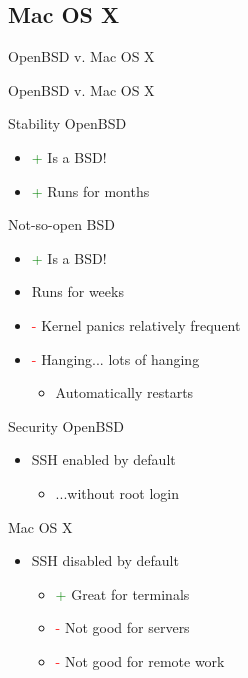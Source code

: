 \documentclass{beamer}
\newcommand{\good}{\textcolor{green}{+ }}
\newcommand{\bad}{\textcolor{red}{- }}
\begin{document}
		\subsection{Mac OS X}
			\begin{frame}{OpenBSD v. Mac OS X}
				\begin{center}
					OpenBSD v. Mac OS X
				\end{center}
			\end{frame}
			\begin{frame}{Stability}
				OpenBSD
				\begin{itemize}
					\item \good Is a BSD!
					\item \good Runs for months
				\end{itemize}
				Not-so-open BSD
				\begin{itemize}
					\item \good Is a BSD!
					\item Runs for weeks
					\item \bad Kernel panics relatively frequent
					\item \bad Hanging... lots of hanging
					\begin{itemize}
						\item Automatically restarts
					\end{itemize}
				\end{itemize}
			\end{frame}
			\begin{frame}{Security}
				OpenBSD
				\begin{itemize}
					\item SSH enabled by default
					\begin{itemize}
						\item ...without root login
					\end{itemize}
				\end{itemize}
				Mac OS X
				\begin{itemize}
					\item SSH disabled by default
					\begin{itemize}
						\item \good Great for terminals
						\item \bad Not good for servers
						\item \bad Not good for remote work
					\end{itemize}
				\end{itemize}
			\end{frame}
\end{document}

